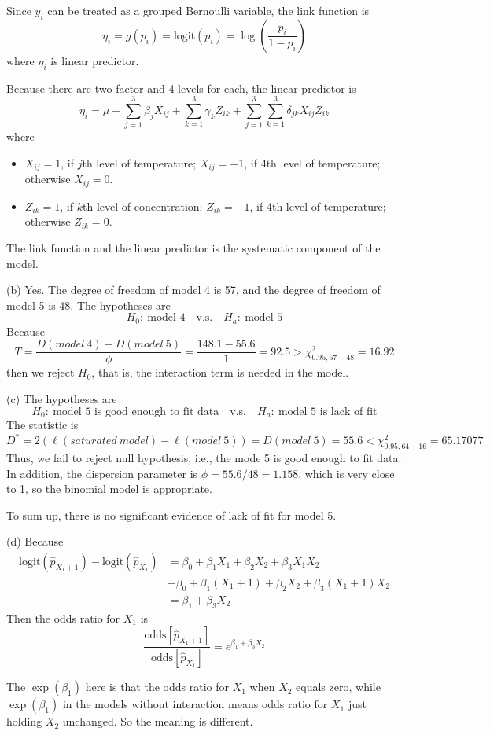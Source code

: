 \documentclass[letterpaper, 12pt]{article}
\newcommand{\ba}{$$\begin{aligned}}
\newcommand{\ea}{\end{aligned}$$}
\begin{document}
Since $y_i$ can be treated as a grouped Bernoulli variable, the link function is 
$$
\eta_i=g(p_i)=\text{logit}(p_i)=\log\left(\frac{p_i}{1-p_i}\right)
$$
where $\eta_i$ is linear predictor.

Because there are two factor and 4 levels for each, the linear predictor is
$$
\eta_i=\mu+\sum_{j=1}^{3}\beta_jX_{ij}+\sum_{k=1}^{3}\gamma_kZ_{ik}+\sum_{j=1}^{3}\sum_{k=1}^{3}\delta_{jk}X_{ij}Z_{ik}
$$
where
\begin{itemize}
\item $X_{ij}=1$, if $j$th level of temperature; $X_{ij}=-1$, if 4th level of temperature; otherwise $X_{ij}=0$.
\item $Z_{ik}=1$, if $k$th level of concentration; $Z_{ik}=-1$, if 4th level of temperature; otherwise $Z_{ik}=0$.
\end{itemize}
The link function and the linear predictor is the systematic component of the model.


(b) Yes. The degree of freedom of model 4 is 57, and the degree of freedom of model 5 is 48. The hypotheses are
$$
H_0:~\text{model 4}\quad\text{v.s.}\quad H_a:~\text{model 5}
$$
Because 
$$
T=\frac{D(model~4)-D(model~5)}{\phi}=\frac{148.1-55.6}{1}=92.5>\chi^2_{0.95,57-48}=16.92
$$
then we reject $H_0$, that is, the interaction term is needed in the model.


(c) The hypotheses are
$$
H_0:~\text{model 5 is good enough to fit data}\quad\text{v.s.}\quad H_a:~\text{model 5 is lack of fit}
$$
The statistic is
$$
D^*=2(\ell(saturated~model)-\ell(model~5))=D(model~5)=55.6<\chi^2_{0.95,64-16}=65.17077
$$
Thus, we fail to reject null hypothesis, i.e., the mode 5 is good enough to fit data. In addition, the dispersion parameter is $\phi=55.6/48=1.158$, which is very close to 1, so the binomial model is appropriate.

To sum up, there is no significant evidence of lack of fit for model 5.


(d) Because
\ba
\text{logit}(\hat{p}_{X_1+1})-\text{logit}(\hat{p}_{X_1})&=\beta_0+\beta_1X_1+\beta_2X_2+\beta_3X_1X_2\\
&-\beta_0+\beta_1(X_1+1)+\beta_2X_2+\beta_3(X_1+1)X_2\\
&=\beta_1+\beta_3X_2
\ea
Then the odds ratio for $X_1$ is 
$$
\frac{\text{odds}[\hat{p}_{X_1+1}]}{\text{odds}[\hat{p}_{X_1}]}=e^{\beta_1+\beta_3X_2}
$$

The $\exp(\beta_1)$ here is that the odds ratio for $X_1$ when $X_2$ equals zero, while $\exp(\beta_1)$ in the models without interaction means odds ratio for $X_1$ just holding $X_2$ unchanged. So the meaning is different.
\end{document}
